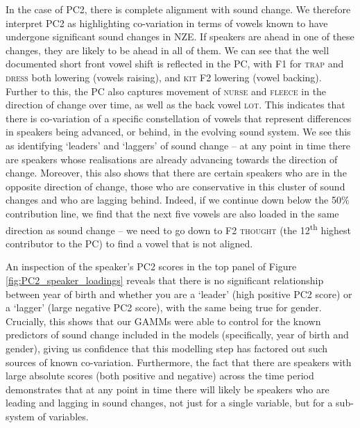 \documentclass[review]{elsarticle} %
\begin{document}
In the case of PC2, there is complete alignment with sound change. We therefore interpret PC2 as highlighting co-variation in terms of vowels known to have undergone significant sound changes in NZE. If speakers are ahead in one of these changes, they are likely to be ahead in all of them.  We can see that the well documented short front vowel shift is reflected in the PC, with F1 for \textsc{trap} and \textsc{dress} both lowering (vowels raising), and \textsc{kit} F2 lowering (vowel backing). Further to this, the PC also captures movement of \textsc{nurse} and \textsc{fleece} in the direction of change over time, as well as the back vowel \textsc{lot}. This indicates that there is co-variation of a specific constellation of vowels that represent differences in speakers being advanced, or behind, in the evolving sound system. We see this as identifying `leaders' and `laggers' of sound change -- at any point in time there are speakers whose realisations are already advancing towards the direction of change. Moreover, this also shows that there are certain speakers who are in the opposite direction of change, those who are conservative in this cluster of sound changes and who are lagging behind.  Indeed, if we continue down below the 50\% contribution line, we find that the next five vowels are also loaded in the same direction as sound change -- we need to go down to F2 \textsc{thought} (the 12\textsuperscript{th} highest contributor to the PC) to find a vowel that is not aligned.

An inspection of the speaker's PC2 scores in the top panel of Figure \ref{fig:PC2_speaker_loadings} reveals that there is no significant relationship between year of birth and whether you are a `leader' (high positive PC2 score) or a `lagger' (large negative PC2 score), with the same being true for gender. Crucially, this shows that our GAMMs were able to control for the known predictors of sound change included in the models (specifically, year of birth and gender), giving us confidence that this modelling step has factored out such sources of known co-variation. Furthermore, the fact that there are speakers with large absolute scores (both positive and negative) across the time period demonstrates that at any point in time there will likely be speakers who are leading and lagging in sound changes, not just for a single variable, but for a sub-system of variables.
\end{document}
